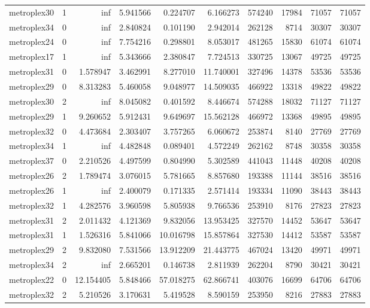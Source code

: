 \begin{longtable}{|l|r|r|r|r|r|r|r|r|r|}
metroplex30 & 1 & inf & 5.941566 & 0.224707 & 6.166273 & 574240 & 17984 & 71057 & 71057 \\
metroplex34 & 0 & inf & 2.840824 & 0.101190 & 2.942014 & 262128 & 8714 & 30307 & 30307 \\
metroplex24 & 0 & inf & 7.754216 & 0.298801 & 8.053017 & 481265 & 15830 & 61074 & 61074 \\
metroplex17 & 1 & inf & 5.343666 & 2.380847 & 7.724513 & 330725 & 13067 & 49725 & 49725 \\
metroplex31 & 0 & 1.578947 & 3.462991 & 8.277010 & 11.740001 & 327496 & 14378 & 53536 & 53536 \\
metroplex29 & 0 & 8.313283 & 5.460058 & 9.048977 & 14.509035 & 466922 & 13318 & 49822 & 49822 \\
metroplex30 & 2 & inf & 8.045082 & 0.401592 & 8.446674 & 574288 & 18032 & 71127 & 71127 \\
metroplex29 & 1 & 9.260652 & 5.912431 & 9.649697 & 15.562128 & 466972 & 13368 & 49895 & 49895 \\
metroplex32 & 0 & 4.473684 & 2.303407 & 3.757265 & 6.060672 & 253874 & 8140 & 27769 & 27769 \\
metroplex34 & 1 & inf & 4.482848 & 0.089401 & 4.572249 & 262162 & 8748 & 30358 & 30358 \\
metroplex37 & 0 & 2.210526 & 4.497599 & 0.804990 & 5.302589 & 441043 & 11448 & 40208 & 40208 \\
metroplex26 & 2 & 1.789474 & 3.076015 & 5.781665 & 8.857680 & 193388 & 11144 & 38516 & 38516 \\
metroplex26 & 1 & inf & 2.400079 & 0.171335 & 2.571414 & 193334 & 11090 & 38443 & 38443 \\
metroplex32 & 1 & 4.282576 & 3.960598 & 5.805938 & 9.766536 & 253910 & 8176 & 27823 & 27823 \\
metroplex31 & 2 & 2.011432 & 4.121369 & 9.832056 & 13.953425 & 327570 & 14452 & 53647 & 53647 \\
metroplex31 & 1 & 1.526316 & 5.841066 & 10.016798 & 15.857864 & 327530 & 14412 & 53587 & 53587 \\
metroplex29 & 2 & 9.832080 & 7.531566 & 13.912209 & 21.443775 & 467024 & 13420 & 49971 & 49971 \\
metroplex34 & 2 & inf & 2.665201 & 0.146738 & 2.811939 & 262204 & 8790 & 30421 & 30421 \\
metroplex22 & 0 & 12.154405 & 5.848466 & 57.018275 & 62.866741 & 403076 & 16699 & 64706 & 64706 \\
metroplex32 & 2 & 5.210526 & 3.170631 & 5.419528 & 8.590159 & 253950 & 8216 & 27883 & 27883 \\

\end{longtable}
